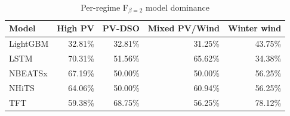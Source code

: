 \begin{table}
\caption{Per-regime F$_{\beta=2}$ model dominance}
\begin{tabular}{lrrrr}
\toprule
Model & High PV & PV-DSO & Mixed PV/Wind & Winter wind \\
\midrule
LightGBM & 32.81\% & 32.81\% & 31.25\% & 43.75\% \\
LSTM & 70.31\% & 51.56\% & 65.62\% & 34.38\% \\
NBEATSx & 67.19\% & 50.00\% & 50.00\% & 56.25\% \\
NHiTS & 64.06\% & 50.00\% & 60.94\% & 56.25\% \\
TFT & 59.38\% & 68.75\% & 56.25\% & 78.12\% \\
\bottomrule
\end{tabular}
\end{table}

